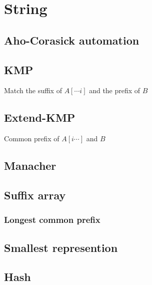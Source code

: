 \section{String}
\subsection{Aho-Corasick automation}


\subsection{KMP}
Match the suffix of $A[\cdots i]$ and the prefix of $B$


\subsection{Extend-KMP}
Common prefix of $A[i\cdots]$ and $B$


\subsection{Manacher}


\subsection{Suffix array}

\subsubsection{Longest common prefix}


\subsection{Smallest represention}


\subsection{Hash}
